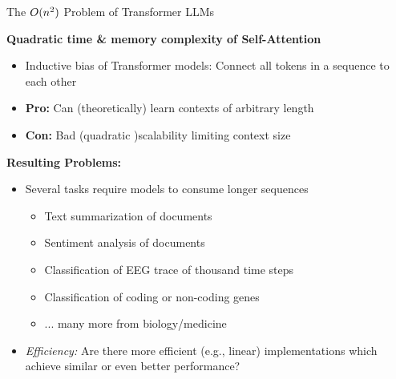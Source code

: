 
\begin{vbframe}{The $O(\MakeLowercase{n}^2)$ Problem of Transformer LLM\MakeLowercase{s}}

\vfill

\textbf{Quadratic time \& memory complexity of Self-Attention}
\begin{itemize}
    \item Inductive bias of Transformer models: Connect all tokens in a sequence to each other
    \item \textbf{Pro:} Can (theoretically) learn contexts of arbitrary length
    \item \textbf{Con:} Bad (quadratic )scalability limiting context size 
\end{itemize}

\vskip3mm

\textbf{Resulting Problems:}
\begin{itemize}
    \item Several tasks require models to consume longer sequences
	\begin{itemize}
	    \item Text summarization of documents
		\item Sentiment analysis of documents
		\item Classification of EEG trace of thousand time steps
		\item Classification of coding or non-coding genes
		\item ... many more from biology/medicine
	\end{itemize}
    \item \textit{Efficiency:} Are there more efficient (e.g., linear) implementations which achieve similar or even better performance?
\end{itemize}

\vfill

\end{vbframe}


